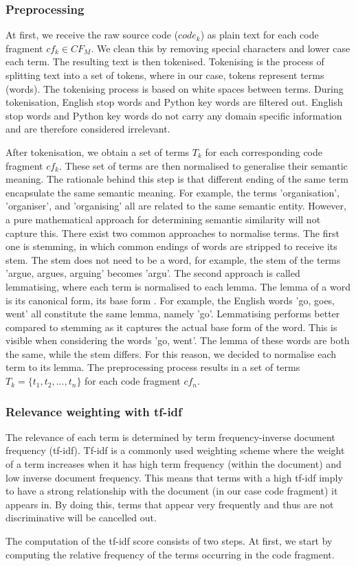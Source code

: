 \subsubsection{Preprocessing}
At first, we receive the raw source code ($code_k$) as plain text for each code fragment $cf_k \in CF_M$. We clean this by removing special characters and lower case each term. The resulting text is then tokenised. Tokenising is the process of splitting text into a set of tokens, where in our case, tokens represent terms (words). The tokenising process is based on white spaces between terms. During tokenisation, English stop words and Python key words are filtered out. English stop words and Python key words do not carry any domain specific information and are therefore considered irrelevant. \par
After tokenisation, we obtain a set of terms $T_k$ for each corresponding code fragment $cf_k$. These set of terms are then normalised to generalise their semantic meaning. The rationale behind this step is that different ending of the same term encapsulate the same semantic meaning. For example, the terms 'organisation', 'organiser', and 'organising' all are related to the same semantic entity. However, a pure mathematical approach for determining semantic similarity will not capture this. There exist two common approaches to normalise terms. The first one is stemming, in which common endings of words are stripped to receive its stem. The stem does not need to be a word, for example, the stem of the terms 'argue, argues, arguing' becomes 'argu'. The second approach is called lemmatising, where each term is normalised to each lemma. The lemma of a word is its canonical form, its base form \cite{plisson2004rule}. For example, the English words 'go, goes, went' all constitute the same lemma, namely 'go'. Lemmatising performs better compared to stemming as it captures the actual base form of the word. This is visible when considering the words 'go, went'. The lemma of these words are both the same, while the stem differs. For this reason, we decided to normalise each term to its lemma. The preprocessing process results in a set of terms $T_k=\{t_1, t_2,...,t_n\}$ for each code fragment $cf_n$.

\subsubsection{Relevance weighting with tf-idf}
The relevance of each term is determined by term frequency-inverse document frequency (tf-idf). Tf-idf is a commonly used weighting scheme where the weight of a term increases when it has high term frequency (within the document) and low inverse document frequency. This means that terms with a high tf-idf imply to have a strong relationship with the document (in our case code fragment) it appears in. By doing this, terms that appear very frequently and thus are not discriminative will be cancelled out. \par
The computation of the tf-idf score consists of two steps. At first, we start by computing the relative frequency of the terms occurring in the code fragment.

